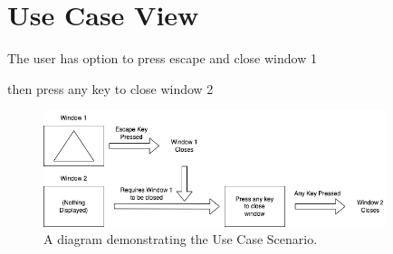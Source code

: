 \section{Use Case View}

The user has option to press escape and close window 1

then press any key to close window 2

\begin{figure}[htb]
    \centering
    \includegraphics[width=10cm]{./Images/UseCaseView.png}
       \caption{A diagram demonstrating the Use Case Scenario.}
           \label{Fig:Fig10}
\end{figure}